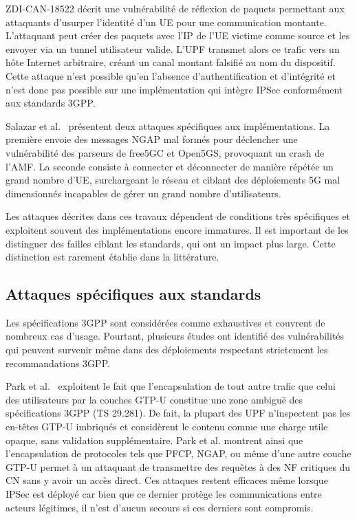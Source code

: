 \documentclass[a4paper,11pt,twoside]{StyleThese}
\begin{document}
ZDI‑CAN‑18522 \cite{spoof_gtp} décrit une vulnérabilité de réflexion de paquets permettant aux attaquants d’usurper l'identité d’un UE pour une communication montante. L’attaquant peut créer des paquets avec l’IP de l’UE victime comme source et les envoyer via un tunnel utilisateur valide. L'UPF transmet alors ce trafic vers un hôte Internet arbitraire, créant un canal montant falsifié au nom du dispositif. Cette attaque n'est possible qu'en l’absence d’authentification et d’intégrité et n’est donc pas possible sur une implémentation qui intègre IPSec conformément aux standards 3GPP.

Salazar et al.~\cite{5greplay} présentent deux attaques spécifiques aux implémentations. La première envoie des messages NGAP mal formés pour déclencher une vulnérabilité des parseurs de free5GC et Open5GS, provoquant un crash de l’AMF. La seconde consiste à connecter et déconnecter de manière répétée un grand nombre d’UE, surchargeant le réseau et ciblant des déploiements 5G mal dimensionnés incapables de gérer un grand nombre d’utilisateurs.

Les attaques décrites dans ces travaux dépendent de conditions très spécifiques et exploitent souvent des implémentations encore immatures. Il est important de les distinguer des failles ciblant les standards, qui ont un impact plus large. Cette distinction est rarement établie dans la littérature.

\subsection{Attaques spécifiques aux standards}

Les spécifications 3GPP sont considérées comme exhaustives et couvrent de nombreux cas d’usage. Pourtant, plusieurs études ont identifié des vulnérabilités qui peuvent survenir même dans des déploiements respectant strictement les recommandations 3GPP. %

Park et al.~\cite{pfcp_in_gtp} exploitent le fait que l’encapsulation de tout autre trafic que celui des utilisateurs par la couches GTP-U constitue une zone ambiguë des spécifications 3GPP (TS 29.281)\cite{ts_29281}. De fait, la plupart des UPF n’inspectent pas les en-têtes GTP-U imbriqués et considèrent le contenu comme une charge utile opaque, sans validation supplémentaire. Park et al. montrent ainsi que l’encapsulation de protocoles tels que PFCP, NGAP, ou même d’une autre couche GTP-U permet à un attaquant de transmettre des requêtes à des NF critiques du CN sans y avoir un accès direct. Ces attaques restent efficaces même lorsque IPSec est déployé car bien que ce dernier protège les communications entre acteurs légitimes, il n'est d'aucun secours si ces derniers sont compromis.
\end{document}
